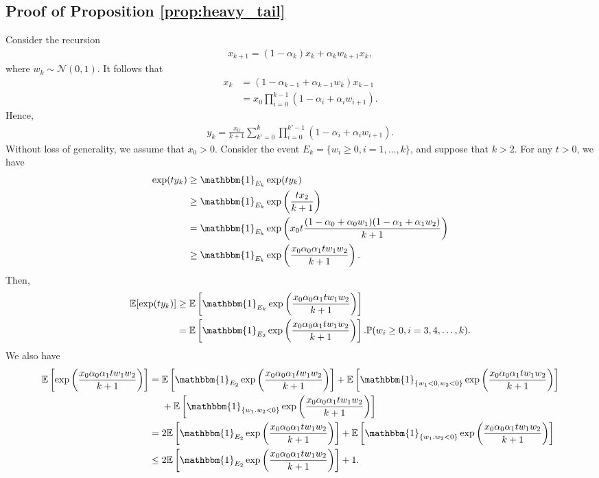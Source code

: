 \documentclass[letterpaper, 10 pt]{article}
\newcommand{\E}{\mathbb{E}}
\begin{document}
\subsection{Proof of Proposition \ref{prop:heavy_tail}}\label{proof:heavy_tail}
    Consider the recursion 
    \begin{align*}
        x_{k+1} = (1-\alpha_k)x_k + \alpha_k w_{k+1}x_k,
    \end{align*}
    where $w_k\sim \mathcal{N}(0,1)$. It follows that 
    \begin{align*}
        x_{k} &= (1-\alpha_{k-1}+\alpha_{k-1}w_{k}) x_{k-1}\\
        &= x_0\prod_{i=0}^{k-1} (1-\alpha_i+\alpha_iw_{i+1}).
    \end{align*}
    Hence,
    \begin{align*}
        y_k = \frac{x_0}{k+1}\sum_{k'=0}^{k}\prod_{i=0}^{k'-1} (1-\alpha_i+\alpha_iw_{i+1}).
    \end{align*}
    Without loss of generality, we assume that $x_0>0$. Consider the event $E_k=\{w_i\geq0, i=1,\dots,k\}$, and suppose that $k>2$. For any $t>0$, we have
    \begin{align*}
        \exp(ty_k) & \geq \mathbbm{1}_{E_k}\exp(ty_k) \\
        &\geq \mathbbm{1}_{E_k}\exp\left(\frac{tx_2}{k+1}\right) \\
        &= \mathbbm{1}_{E_k}\exp\left(x_0t\frac{(1-\alpha_0+\alpha_0w_1)(1-\alpha_1+\alpha_1w_2)}{k+1}\right) \\
        &\geq \mathbbm{1}_{E_k}\exp\left(\frac{x_0\alpha_0\alpha_1tw_1w_2}{k+1}\right).
    \end{align*}
    Then,
    \begin{align*}
        \E[\exp(ty_k)] &\geq \E\left[\mathbbm{1}_{E_k}\exp\left(\frac{x_0\alpha_0\alpha_1tw_1w_2}{k+1}\right)\right]\\
        &= \E\left[\mathbbm{1}_{E_2}\exp\left(\frac{x_0\alpha_0\alpha_1tw_1w_2}{k+1}\right)\right] . \mathbb{P}(w_i\geq0, i=3,4,\dots,k).
    \end{align*}
    We also have
    \begin{align*}
        \E\left[ \exp\left(\frac{x_0\alpha_0\alpha_1tw_1w_2}{k+1}\right)\right] &= \E\left[ \mathbbm{1}_{E_2}\exp\left(\frac{x_0\alpha_0\alpha_1tw_1w_2}{k+1}\right)\right] + \E\left[ \mathbbm{1}_{\{w_1<0,w_2<0\}}\exp\left(\frac{x_0\alpha_0\alpha_1tw_1w_2}{k+1}\right)\right]\\
        &\quad~+ \E\left[ \mathbbm{1}_{\{w_1.w_2<0\}}\exp\left(\frac{x_0\alpha_0\alpha_1tw_1w_2}{k+1}\right)\right] \\
        &=2\E\left[ \mathbbm{1}_{E_2}\exp\left(\frac{x_0\alpha_0\alpha_1tw_1w_2}{k+1}\right)\right] + \E\left[ \mathbbm{1}_{\{w_1.w_2<0\}} \exp\left(\frac{x_0\alpha_0\alpha_1tw_1w_2}{k+1}\right)\right] \\
        &\leq2\E\left[ \mathbbm{1}_{E_2}\exp\left(\frac{x_0\alpha_0\alpha_1tw_1w_2}{k+1}\right)\right] + 1.
    \end{align*}
\end{document}
